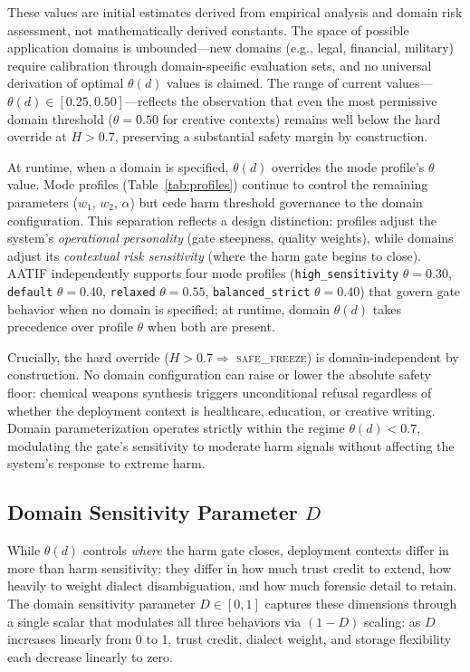 \documentclass[11pt,a4paper]{article}
\begin{document}
These values are initial estimates derived from empirical analysis and domain risk assessment, not mathematically derived constants. The space of possible application domains is unbounded---new domains (e.g., legal, financial, military) require calibration through domain-specific evaluation sets, and no universal derivation of optimal $\theta(d)$ values is claimed. The range of current values---$\theta(d) \in [0.25, 0.50]$---reflects the observation that even the most permissive domain threshold ($\theta = 0.50$ for creative contexts) remains well below the hard override at $H > 0.7$, preserving a substantial safety margin by construction.

At runtime, when a domain is specified, $\theta(d)$ overrides the mode profile's $\theta$ value. Mode profiles (Table~\ref{tab:profiles}) continue to control the remaining parameters ($w_1$, $w_2$, $\alpha$) but cede harm threshold governance to the domain configuration. This separation reflects a design distinction: profiles adjust the system's \emph{operational personality} (gate steepness, quality weights), while domains adjust its \emph{contextual risk sensitivity} (where the harm gate begins to close). AATIF independently supports four mode profiles (\texttt{high\_sensitivity} $\theta = 0.30$, \texttt{default} $\theta = 0.40$, \texttt{relaxed} $\theta = 0.55$, \texttt{balanced\_strict} $\theta = 0.40$) that govern gate behavior when no domain is specified; at runtime, domain $\theta(d)$ takes precedence over profile $\theta$ when both are present.

Crucially, the hard override ($H > 0.7 \Rightarrow$ \textsc{safe\_freeze}) is domain-independent by construction. No domain configuration can raise or lower the absolute safety floor: chemical weapons synthesis triggers unconditional refusal regardless of whether the deployment context is healthcare, education, or creative writing. Domain parameterization operates strictly within the regime $\theta(d) < 0.7$, modulating the gate's sensitivity to moderate harm signals without affecting the system's response to extreme harm.


\subsection{Domain Sensitivity Parameter $D$}
\label{sec:domain_d}

While $\theta(d)$ controls \emph{where} the harm gate closes, deployment contexts differ in more than harm sensitivity: they differ in how much trust credit to extend, how heavily to weight dialect disambiguation, and how much forensic detail to retain. The domain sensitivity parameter $D \in [0,1]$ captures these dimensions through a single scalar that modulates all three behaviors via $(1-D)$ scaling: as $D$ increases linearly from 0 to 1, trust credit, dialect weight, and storage flexibility each decrease linearly to zero.
\end{document}
